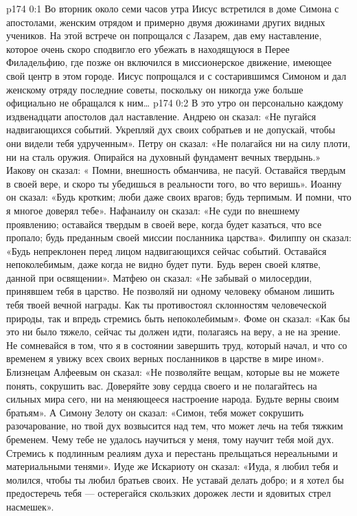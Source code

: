 \vs p174 0:1 Во вторник около семи часов утра Иисус встретился в доме Симона с апостолами, женским отрядом и примерно двумя дюжинами других видных учеников. На этой встрече он попрощался с Лазарем, дав ему наставление, которое очень скоро сподвигло его убежать в находящуюся в Перее Филадельфию, где позже он включился в миссионерское движение, имеющее свой центр в этом городе. Иисус попрощался и с состарившимся Симоном и дал женскому отряду последние советы, поскольку он никогда уже больше официально не обращался к ним\ldots
\vs p174 0:2 В это утро он персонально каждому издвенадцати апостолов дал наставление. Андрею он сказал: «Не пугайся надвигающихся событий. Укрепляй дух своих собратьев и не допускай, чтобы они видели тебя удрученным». Петру он сказал: «Не полагайся ни на силу плоти, ни на сталь оружия. Опирайся на духовный фундамент вечных твердынь.» Иакову он сказал: « Помни, внешность обманчива, не пасуй. Оставайся твердым в своей вере, и скоро ты убедишься в реальности того, во что веришь». Иоанну он сказал: «Будь кротким; люби даже своих врагов; будь терпимым. И помни, что я многое доверял тебе». Нафанаилу он сказал: «Не суди по внешнему проявлению; оставайся твердым в своей вере, когда будет казаться, что все пропало; будь преданным своей миссии посланника царства». Филиппу он сказал: «Будь непреклонен перед лицом надвигающихся сейчас событий. Оставайся непоколебимым, даже когда не видно будет пути. Будь верен своей клятве, данной при освящении». Матфею он сказал: «Не забывай о милосердии, принявшем тебя в царство. Не позволяй ни одному человеку обманом лишить тебя твоей вечной награды. Как ты противостоял склонностям человеческой природы, так и впредь стремись быть непоколебимым». Фоме он сказал: «Как бы это ни было тяжело, сейчас ты должен идти, полагаясь на веру, а не на зрение. Не сомневайся в том, что я в состоянии завершить труд, который начал, и что со временем я увижу всех своих верных посланников в царстве в мире ином». Близнецам Алфеевым он сказал: «Не позволяйте вещам, которые вы не можете понять, сокрушить вас. Доверяйте зову сердца своего и не полагайтесь на сильных мира сего, ни на меняющееся настроение народа. Будьте верны своим братьям». А Симону Зелоту он сказал: «Симон, тебя может сокрушить разочарование, но твой дух возвысится над тем, что может лечь на тебя тяжким бременем. Чему тебе не удалось научиться у меня, тому научит тебя мой дух. Стремись к подлинным реалиям духа и перестань прельщаться нереальными и материальными тенями». Иуде же Искариоту он сказал: «Иуда, я любил тебя и молился, чтобы ты любил братьев своих. Не уставай делать добро; и я хотел бы предостеречь тебя --- остерегайся скользких дорожек лести и ядовитых стрел насмешек».
